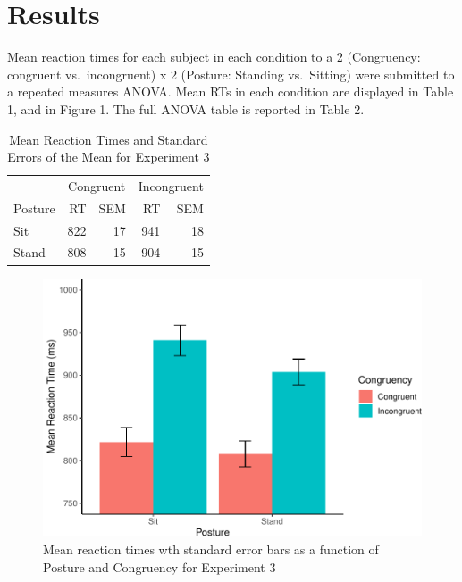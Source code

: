 \documentclass[
  english,
  man]{apa6}
\begin{document}
\hypertarget{results}{%
\section{Results}\label{results}}

Mean reaction times for each subject in each condition to a 2 (Congruency: congruent vs.~incongruent) x 2 (Posture: Standing vs.~Sitting) were submitted to a repeated measures ANOVA. Mean RTs in each condition are displayed in Table 1, and in Figure 1. The full ANOVA table is reported in Table 2.

\begin{table}

\caption{\label{tab:unnamed-chunk-2}Mean Reaction Times and Standard Errors of the Mean for Experiment 3}
\centering
\begin{tabular}[t]{lrrrr}
\toprule
\multicolumn{1}{c}{ } & \multicolumn{2}{c}{Congruent} & \multicolumn{2}{c}{Incongruent} \\
\cmidrule(l{3pt}r{3pt}){2-3} \cmidrule(l{3pt}r{3pt}){4-5}
Posture & RT & SEM & RT & SEM\\
\midrule
Sit & 822 & 17 & 941 & 18\\
Stand & 808 & 15 & 904 & 15\\
\bottomrule
\end{tabular}
\end{table}

\begin{figure}
\centering
\includegraphics{APAreport_files/figure-latex/stroopfig-1.pdf}
\caption{\label{fig:stroopfig}Mean reaction times wth standard error bars as a function of Posture and Congruency for Experiment 3}
\end{figure}
\end{document}
